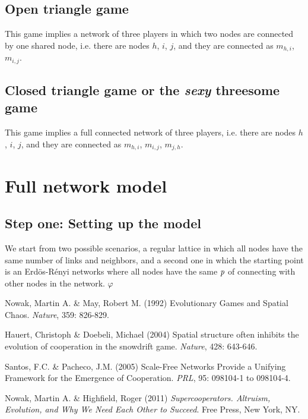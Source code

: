 \documentclass[11pt]{article}
\begin{document}
\subsection{Open triangle game}
This game implies a network of three players in which two nodes are connected by one shared node, i.e. there are nodes $h$, $i$, $j$, and they are connected as $m_{h,i}$, $m_{i,j}$.

\subsection{Closed triangle game or the \emph{sexy} threesome game}
This game implies a full connected network of three players, i.e. there are nodes $h$, $i$, $j$, and they are connected as $m_{h,i}$, $m_{i,j}$, $m_{j,h}$.

\section{Full network model}
\subsection{Step one: Setting up the model}

We start from two possible scenarios, a regular lattice in which all nodes have the
same number of links and neighbors, and a second one in which the
starting point is an Erd\"{o}s-R\'enyi networks where all nodes have the
same $\emph{p}$ of connecting with other nodes in the network. $\varphi$

\begin{thebibliography}{30}

 Nowak, Martin A. \& May, Robert M. (1992) Evolutionary Games and Spatial Chaos. \textit{Nature}, 359: 826-829.

 Hauert, Christoph \& Doebeli, Michael (2004) Spatial structure often inhibits the evolution of cooperation in the snowdrift game. \textit{Nature}, 428: 643-646.

 Santos, F.C. \& Pacheco, J.M. (2005) Scale-Free Networks Provide a Unifying Framework for the Emergence of Cooperation. \textit{PRL}, 95: 098104-1 to 098104-4.

 Nowak, Martin A. \& Highfield, Roger (2011) \textit{Supercooperators. Altruism, Evolution, and Why We Need Each Other to Succeed}. Free Press, New York, NY.

\end{thebibliography}
\end{document}
